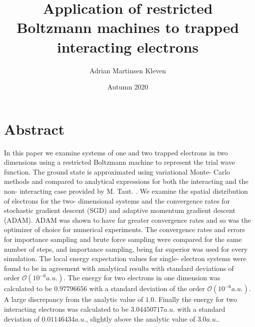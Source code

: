 \documentclass[11pt,a4paper,titlepage]{article}
\title{Application of restricted Boltzmann machines to trapped interacting electrons}
\author{Adrian Martinsen Kleven}
\date{Autumn 2020}
\begin{document}
\maketitle
\tableofcontents
\listoffigures
\listoftables
\clearpage
\section{Abstract}
In this paper we examine systems of one and two trapped electrons in two dimensions using a restricted Boltzmann machine to represent the trial wave function. The ground state is approximated using variational Monte- Carlo methods and compared to analytical expressions for both the interacting and the non- interacting case provided by M. Taut. \cite{PhysRevA.48.3561}. We examine the spatial distribution of electrons for the two- dimensional systems and the convergence rates for stochastic gradient descent (SGD) and adaptive momentum gradient descent (ADAM). ADAM was shown to have far greater convergence rates and so was the optimizer of choice for numerical experiments. The convergence rates and errors for importance sampling and brute force sampling were compared for the same number of steps, and importance sampling, being far superior was used for every simulation. The local energy expectation values for single- electron systems were found to be in agreement with analytical results with standard deviations of order $\mathcal{O}(10^{-6}a.u.)$. The energy for two electrons in one dimension was calculated to be $0.97796656$ with a standard deviation of the order $\mathcal{O}(10^{-6}a.u.)$. A large discrepancy from the analytic value of $1.0$. Finally the energy for two interacting electrons was calculated to be $3.04450717a.u.$ with a standard deviation of $0.01146434a.u.$, slightly above the analytic value of $3.0a.u.$.
\end{document}
